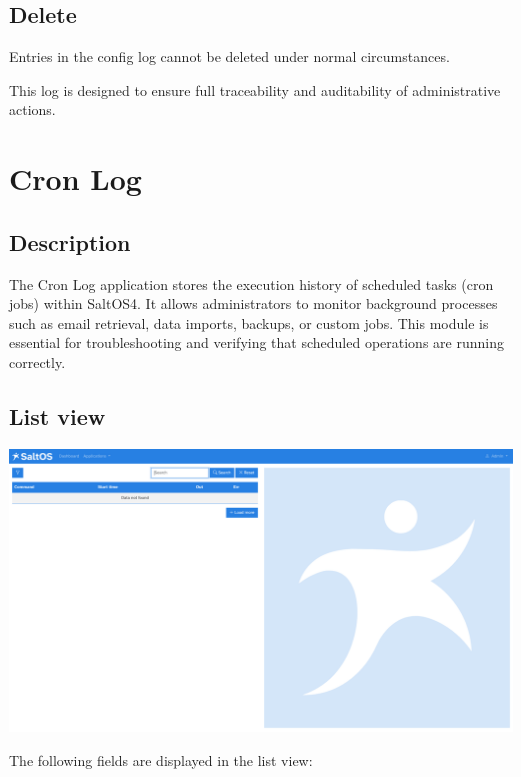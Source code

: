 \documentclass[a4paper]{article}
\begin{document}
\hypertarget{toc10}{}
\subsection{Delete}

Entries in the config log cannot be deleted under normal circumstances.

This log is designed to ensure full traceability and auditability of administrative actions.


\hypertarget{toc11}{}
\section{Cron Log}

\hypertarget{toc12}{}
\subsection{Description}

The Cron Log application stores the execution history of scheduled tasks (cron jobs) within SaltOS4.
It allows administrators to monitor background processes such as email retrieval, data imports, backups, or custom jobs.
This module is essential for troubleshooting and verifying that scheduled operations are running correctly.

\hypertarget{toc13}{}
\subsection{List view}

\begin{center}\includegraphics[width=1\textwidth]{../ujest/snaps/test-screenshots-js-screenshots-common-cronlog-list-en-us-1-snap.png}\end{center}

The following fields are displayed in the list view:
\end{document}
